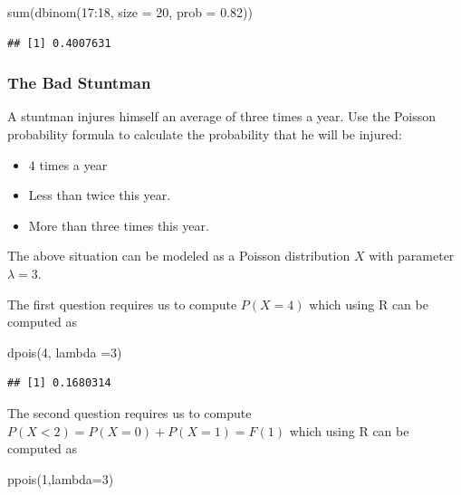 \documentclass[
]{book}
\newenvironment{Shaded}{\begin{snugshade}}{\end{snugshade}}
\newcommand{\AttributeTok}[1]{\textcolor[rgb]{0.77,0.63,0.00}{#1}}
\newcommand{\DecValTok}[1]{\textcolor[rgb]{0.00,0.00,0.81}{#1}}
\newcommand{\FloatTok}[1]{\textcolor[rgb]{0.00,0.00,0.81}{#1}}
\newcommand{\FunctionTok}[1]{\textcolor[rgb]{0.00,0.00,0.00}{#1}}
\newcommand{\NormalTok}[1]{#1}
\newcommand{\SpecialCharTok}[1]{\textcolor[rgb]{0.00,0.00,0.00}{#1}}
\begin{document}
\begin{Shaded}
\begin{Highlighting}[]
\FunctionTok{sum}\NormalTok{(}\FunctionTok{dbinom}\NormalTok{(}\DecValTok{17}\SpecialCharTok{:}\DecValTok{18}\NormalTok{, }\AttributeTok{size =} \DecValTok{20}\NormalTok{, }\AttributeTok{prob =} \FloatTok{0.82}\NormalTok{))}
\end{Highlighting}
\end{Shaded}

\begin{verbatim}
## [1] 0.4007631
\end{verbatim}

\hypertarget{the-bad-stuntman}{%
\subsubsection{The Bad Stuntman}\label{the-bad-stuntman}}

A stuntman injures himself an average of three times a year. Use the Poisson probability formula to calculate the probability that he will be injured:

\begin{itemize}
\item
  4 times a year
\item
  Less than twice this year.
\item
  More than three times this year.
\end{itemize}

The above situation can be modeled as a Poisson distribution \(X\) with parameter \(\lambda = 3\).

The first question requires us to compute \(P(X=4)\) which using R can be computed as

\begin{Shaded}
\begin{Highlighting}[]
\FunctionTok{dpois}\NormalTok{(}\DecValTok{4}\NormalTok{, }\AttributeTok{lambda =}\DecValTok{3}\NormalTok{)}
\end{Highlighting}
\end{Shaded}

\begin{verbatim}
## [1] 0.1680314
\end{verbatim}

The second question requires us to compute \(P(X<2) = P(X=0)+P(X=1)= F(1)\) which using R can be computed as

\begin{Shaded}
\begin{Highlighting}[]
\FunctionTok{ppois}\NormalTok{(}\DecValTok{1}\NormalTok{,}\AttributeTok{lambda=}\DecValTok{3}\NormalTok{)}
\end{Highlighting}
\end{Shaded}
\end{document}
